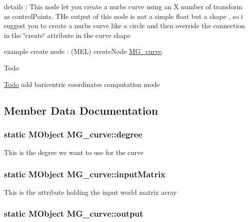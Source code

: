 details \-: This node let you create a nurbs curve using an X number of transform as control\-Points. T\-He output of this node is not a simple float but a shape , so i suggest you to create a nurbs curve like a circle and then override the connection in the \char`\"{}create\char`\"{} attribute in the curve shape

example create node \-: (M\-E\-L) create\-Node \hyperlink{class_m_g__curve}{M\-G\-\_\-curve}.

\begin{DoxyRefDesc}{Todo}
\item[\hyperlink{todo__todo000007}{Todo}]add baricentric coordinates computation mode\end{DoxyRefDesc}


\subsection{Member Data Documentation}
\hypertarget{class_m_g__curve_a3330e534c2b2d2b7db3c621af0c4d6b2}{
\subsubsection[{degree}]{\setlength{\rightskip}{0pt plus 5cm}static M\-Object M\-G\-\_\-curve\-::degree\hspace{0.3cm}{\ttfamily [static]}}}\label{class_m_g__curve_a3330e534c2b2d2b7db3c621af0c4d6b2}
This is the degree we want to use for the curve \hypertarget{class_m_g__curve_a81892d761eb59f6ae72dc5455e37de26}{
\subsubsection[{input\-Matrix}]{\setlength{\rightskip}{0pt plus 5cm}static M\-Object M\-G\-\_\-curve\-::input\-Matrix\hspace{0.3cm}{\ttfamily [static]}}}\label{class_m_g__curve_a81892d761eb59f6ae72dc5455e37de26}
This is the attribute holding the input world matrix array \hypertarget{class_m_g__curve_a2e9dc1c2f81ae96e443d7ce8db7ff668}{
\subsubsection[{output}]{\setlength{\rightskip}{0pt plus 5cm}static M\-Object M\-G\-\_\-curve\-::output\hspace{0.3cm}{\ttfamily [static]}}}\label{class_m_g__curve_a2e9dc1c2f81ae96e443d7ce8db7ff668}
